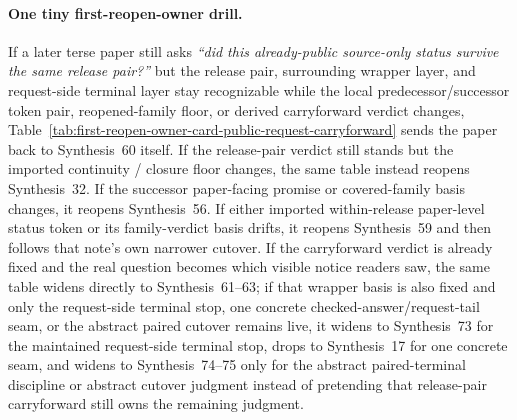 \documentclass[11pt]{article}
\begin{document}
\paragraph{One tiny first-reopen-owner drill.}
If a later terse paper still asks \emph{``did this already-public source-only status survive the same release pair?''} but the release pair, surrounding wrapper layer, and request-side terminal layer stay recognizable while the local predecessor/successor token pair, reopened-family floor, or derived carryforward verdict changes, Table~\ref{tab:first-reopen-owner-card-public-request-carryforward} sends the paper back to Synthesis~60 itself. If the release-pair verdict still stands but the imported continuity / closure floor changes, the same table instead reopens Synthesis~32. If the successor paper-facing promise or covered-family basis changes, it reopens Synthesis~56. If either imported within-release paper-level status token or its family-verdict basis drifts, it reopens Synthesis~59 and then follows that note's own narrower cutover. If the carryforward verdict is already fixed and the real question becomes which visible notice readers saw, the same table widens directly to Synthesis~61--63; if that wrapper basis is also fixed and only the request-side terminal stop, one concrete checked-answer/request-tail seam, or the abstract paired cutover remains live, it widens to Synthesis~73 for the maintained request-side terminal stop, drops to Synthesis~17 for one concrete seam, and widens to Synthesis~74--75 only for the abstract paired-terminal discipline or abstract cutover judgment instead of pretending that release-pair carryforward still owns the remaining judgment.\cite{series:releasespine,series:publicrequestcontracts,series:publicrequeststatusenvelopes,series:publicrequestnotices,series:publicrequestnoticenormalforms,series:publicrequestnoticeselections,series:publicrequestresponsepacketrefreshresponsepacketclosureverdicts,series:pairedterminalcitationdiscipline,series:pairedterminalcutoverrule,series:workedexample}
\end{document}

